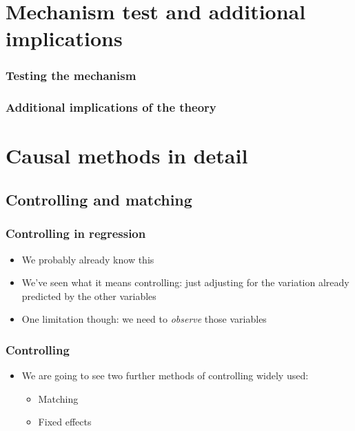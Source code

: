\documentclass[aspectratio=43]{beamer}
\begin{document}
\section{Mechanism test and additional implications}

\begin{frame}
\frametitle{Testing the mechanism}
\centering



\end{frame}

\begin{frame}
\frametitle{Additional implications of the theory}
\centering



\end{frame}

\section{Causal methods in detail}


\subsection{Controlling and matching}

\begin{frame}
\frametitle{Controlling in regression}
\centering

\begin{itemize}
  \item We probably already know this
  \item We've seen what it means controlling: just adjusting for the variation already predicted by the other variables
  \item One limitation though: we need to \textit{observe} those variables
\end{itemize}

\end{frame}

\begin{frame}
\frametitle{Controlling}
\centering

\begin{itemize}
  \item We are going to see two further methods of controlling widely used:
  \begin{itemize}
    \item Matching
    \item Fixed effects
  \end{itemize}
\end{itemize}

\end{frame}
\end{document}
